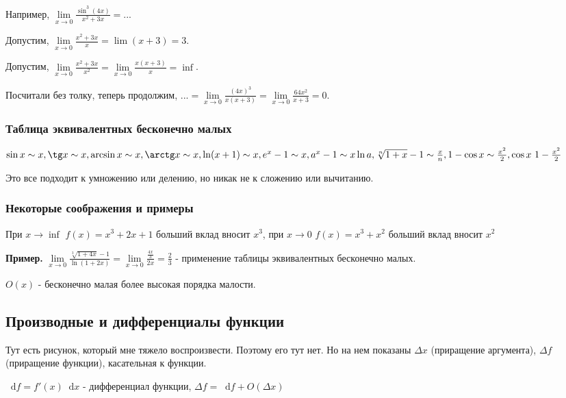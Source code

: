 \documentclass{article}
\newcommand*\diff{\mathop{}\!\mathrm{d}}
\begin{document}
\begin{flushleft}
\hfill

Например, $\lim\limits_{x \to 0} \frac{\sin^3 (4x)}{x^2 + 3x} = ...$

Допустим, $\lim\limits_{x \to 0} \frac{x^2 + 3x}{x} = \lim (x+3) = 3$.

Допустим, $\lim\limits_{x \to 0} \frac{x^2 + 3x}{x^2} = \lim\limits_{x \to 0} \frac{x(x + 3)}{x} = \inf$.

Посчитали без толку, теперь продолжим, $... = \lim\limits_{x \to 0} \frac{(4x)^3}{x(x + 3)} = \lim\limits_{x \to 0} \frac{64x^2}{x + 3} = 0$.

\subsubsection{Таблица эквивалентных бесконечно малых}

$\sin x \sim x, \tg x \sim x, \arcsin x \sim x, \arctg x \sim x, \ln (x + 1) \sim x, e^x - 1 \sim x, a^x - 1 \sim x \ln a, \sqrt[n]{1 + x} - 1 \sim \frac{x}{n}, 1 - \cos x \sim \frac{x^2}{2}, \cos x ~ 1 - \frac{x^2}{2}$

Это все подходит к умножению или делению, но никак не к сложению или вычитанию.

\subsubsection{Некоторые соображения и примеры}

При $x \to \inf$ $f(x) = x^3 + 2x + 1$ больший вклад вносит $x^3$, при $x \to 0$ $f(x) = x^3 + x^2$ больший вклад вносит $x^2$

\hfill 

\textbf{Пример.} $\lim\limits_{x \to 0} \frac{\sqrt[3]{1 + 4x} - 1}{\ln (1 + 2x)} = \lim\limits_{x \to 0} \frac{\frac{4x}{3}}{2x} = \frac{2}{3}$ - применение таблицы эквивалентных бесконечно малых.

\hfill

$O(x)$ - бесконечно малая более высокая порядка малости.

\subsection{Производные и дифференциалы функции}

Тут есть рисунок, который мне тяжело воспроизвести. Поэтому его тут нет. Но на нем показаны $\Delta x$ (приращение аргумента), $\Delta f$ (приращение функции), касательная к функции.

$\diff f = f' (x) \diff x$ - дифференциал функции, $\Delta f = \diff f + O(\Delta x)$


\end{flushleft}
\end{document}
